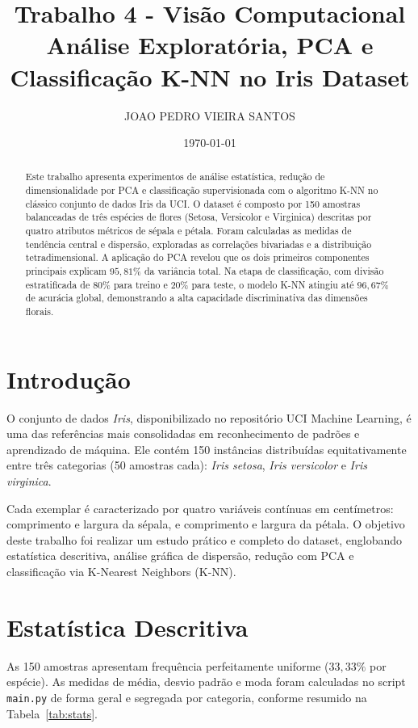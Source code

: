 \documentclass[twocolumn]{article}
\title{Trabalho 4 - Visão Computacional \\ \large Análise Exploratória, PCA e Classificação K-NN no Iris Dataset}
\author{JOAO PEDRO VIEIRA SANTOS}
\date{\today}
\begin{document}
\maketitle

\begin{abstract}
Este trabalho apresenta experimentos de análise estatística, redução de dimensionalidade por PCA e classificação supervisionada com o algoritmo K-NN no clássico conjunto de dados Iris da UCI. O dataset é composto por 150 amostras balanceadas de três espécies de flores (Setosa, Versicolor e Virginica) descritas por quatro atributos métricos de sépala e pétala. Foram calculadas as medidas de tendência central e dispersão, exploradas as correlações bivariadas e a distribuição tetradimensional. A aplicação do PCA revelou que os dois primeiros componentes principais explicam $95{,}81\%$ da variância total. Na etapa de classificação, com divisão estratificada de 80\% para treino e 20\% para teste, o modelo K-NN atingiu até $96{,}67\%$ de acurácia global, demonstrando a alta capacidade discriminativa das dimensões florais.
\end{abstract}

\section{Introdução}
O conjunto de dados \textit{Iris}, disponibilizado no repositório UCI Machine Learning, é uma das referências mais consolidadas em reconhecimento de padrões e aprendizado de máquina. Ele contém 150 instâncias distribuídas equitativamente entre três categorias (50 amostras cada): \textit{Iris setosa}, \textit{Iris versicolor} e \textit{Iris virginica}.

Cada exemplar é caracterizado por quatro variáveis contínuas em centímetros: comprimento e largura da sépala, e comprimento e largura da pétala. O objetivo deste trabalho foi realizar um estudo prático e completo do dataset, englobando estatística descritiva, análise gráfica de dispersão, redução com PCA e classificação via K-Nearest Neighbors (K-NN).

\section{Estatística Descritiva}
As 150 amostras apresentam frequência perfeitamente uniforme ($33{,}33\%$ por espécie). As medidas de média, desvio padrão e moda foram calculadas no script \texttt{main.py} de forma geral e segregada por categoria, conforme resumido na Tabela~\ref{tab:stats}.
\end{document}
